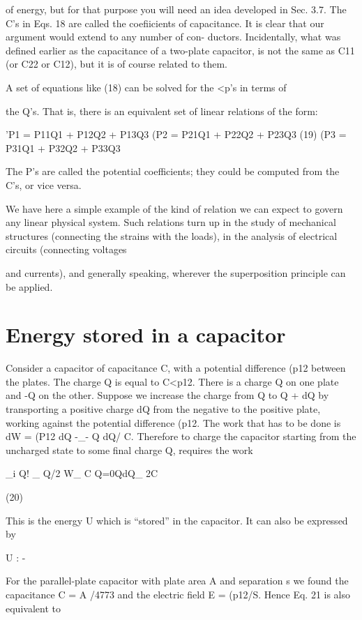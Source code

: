 of energy, but for that purpose you will need an idea developed in
Sec. 3.7. The C's in Eqs. 18 are called the coefiicients of capacitance.
It is clear that our argument would extend to any number of con-
ductors. Incidentally, what was defined earlier as the capacitance
of a two-plate capacitor, is not the same as C11 (or C22 or C12), but
it is of course related to them.

A set of equations like (18) can be solved for the <p's in terms of

the Q's. That is, there is an equivalent set of linear relations of the
form:

'P1 = P11Q1 + P12Q2 + P13Q3
(P2 = P21Q1 + P22Q2 + P23Q3 (19)
(P3 = P31Q1 + P32Q2 + P33Q3

The P's are called the potential coefficients; they could be computed
from the C's, or vice versa.

We have here a simple example of the kind of relation we can
expect to govern any linear physical system. Such relations turn up
in the study of mechanical structures (connecting the strains with
the loads), in the analysis of electrical circuits (connecting voltages

and currents), and generally speaking, wherever the superposition
principle can be applied.

\section{Energy stored in a capacitor}

Consider a capacitor of capacitance C, with a potential difference
(p12 between the plates. The charge Q is equal to C<p12. There is a
charge Q on one plate and -Q on the other. Suppose we increase
the charge from Q to Q + dQ by transporting a positive charge dQ
from the negative to the positive plate, working against the potential
difference (p12. The work that has to be done is dW = (P12 dQ -_-
Q dQ/ C. Therefore to charge the capacitor starting from the uncharged
state to some final charge Q, requires the work

_i Q! _ Q/2
W_ C Q=0QdQ_ 2C

(20)

This is the energy U which is ``stored'' in the capacitor. It can also
be expressed by

U : -%

For the parallel-plate capacitor with plate area A and separation s
we found the capacitance C = A /4773 and the electric field E = (p12/S.
Hence Eq. 21 is also equivalent to

